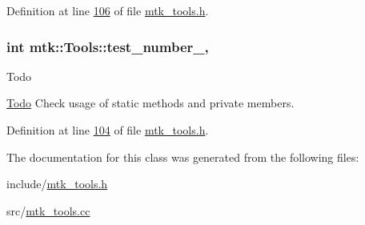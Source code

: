 Definition at line \hyperlink{mtk__tools_8h_source_l00106}{106} of file \hyperlink{mtk__tools_8h_source}{mtk\-\_\-tools.\-h}.

\hypertarget{classmtk_1_1Tools_a04a60458594336ee1badff79b8a9a77f}{
\subsubsection[{test\-\_\-number\-\_\-}]{\setlength{\rightskip}{0pt plus 5cm}int mtk\-::\-Tools\-::test\-\_\-number\-\_\-\hspace{0.3cm}{\ttfamily [static]}, {\ttfamily [private]}}}\label{classmtk_1_1Tools_a04a60458594336ee1badff79b8a9a77f}
\begin{DoxyRefDesc}{Todo}
\item[\hyperlink{todo__todo000018}{Todo}]Check usage of static methods and private members. \end{DoxyRefDesc}


Definition at line \hyperlink{mtk__tools_8h_source_l00104}{104} of file \hyperlink{mtk__tools_8h_source}{mtk\-\_\-tools.\-h}.



The documentation for this class was generated from the following files\-:\begin{DoxyCompactItemize}
\item 
include/\hyperlink{mtk__tools_8h}{mtk\-\_\-tools.\-h}\item 
src/\hyperlink{mtk__tools_8cc}{mtk\-\_\-tools.\-cc}\end{DoxyCompactItemize}
